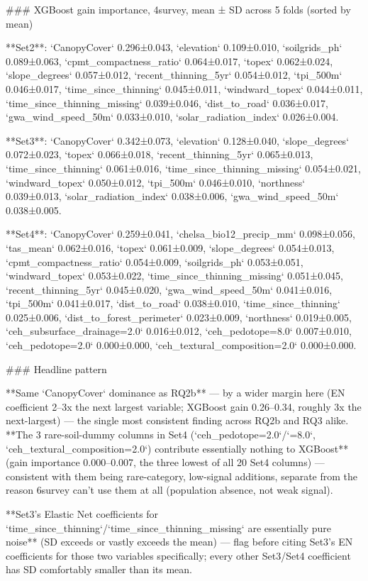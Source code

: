 ### XGBoost gain importance, 4survey, mean ± SD across 5 folds (sorted by mean)

**Set2**: `CanopyCover` 0.296±0.043, `elevation` 0.109±0.010, `soilgrids_ph` 0.089±0.063,
`cpmt_compactness_ratio` 0.064±0.017, `topex` 0.062±0.024, `slope_degrees` 0.057±0.012,
`recent_thinning_5yr` 0.054±0.012, `tpi_500m` 0.046±0.017, `time_since_thinning` 0.045±0.011,
`windward_topex` 0.044±0.011, `time_since_thinning_missing` 0.039±0.046, `dist_to_road`
0.036±0.017, `gwa_wind_speed_50m` 0.033±0.010, `solar_radiation_index` 0.026±0.004.

**Set3**: `CanopyCover` 0.342±0.073, `elevation` 0.128±0.040, `slope_degrees` 0.072±0.023,
`topex` 0.066±0.018, `recent_thinning_5yr` 0.065±0.013, `time_since_thinning` 0.061±0.016,
`time_since_thinning_missing` 0.054±0.021, `windward_topex` 0.050±0.012, `tpi_500m`
0.046±0.010, `northness` 0.039±0.013, `solar_radiation_index` 0.038±0.006, `gwa_wind_speed_50m`
0.038±0.005.

**Set4**: `CanopyCover` 0.259±0.041, `chelsa_bio12_precip_mm` 0.098±0.056, `tas_mean`
0.062±0.016, `topex` 0.061±0.009, `slope_degrees` 0.054±0.013, `cpmt_compactness_ratio`
0.054±0.009, `soilgrids_ph` 0.053±0.051, `windward_topex` 0.053±0.022,
`time_since_thinning_missing` 0.051±0.045, `recent_thinning_5yr` 0.045±0.020,
`gwa_wind_speed_50m` 0.041±0.016, `tpi_500m` 0.041±0.017, `dist_to_road` 0.038±0.010,
`time_since_thinning` 0.025±0.006, `dist_to_forest_perimeter` 0.023±0.009, `northness`
0.019±0.005, `ceh_subsurface_drainage=2.0` 0.016±0.012, `ceh_pedotope=8.0` 0.007±0.010,
`ceh_pedotope=2.0` 0.000±0.000, `ceh_textural_composition=2.0` 0.000±0.000.

### Headline pattern

**Same `CanopyCover` dominance as RQ2b** — by a wider margin here (EN coefficient 2–3x the next
largest variable; XGBoost gain 0.26–0.34, roughly 3x the next-largest) — the single most
consistent finding across RQ2b and RQ3 alike. **The 3 rare-soil-dummy columns in Set4
(`ceh_pedotope=2.0`/`=8.0`, `ceh_textural_composition=2.0`) contribute essentially nothing to
XGBoost** (gain importance 0.000–0.007, the three lowest of all 20 Set4 columns) — consistent
with them being rare-category, low-signal additions, separate from the reason 6survey can't use
them at all (population absence, not weak signal).

**Set3's Elastic Net coefficients for `time_since_thinning`/`time_since_thinning_missing` are
essentially pure noise** (SD exceeds or vastly exceeds the mean) — flag before citing Set3's EN
coefficients for those two variables specifically; every other Set3/Set4 coefficient has SD
comfortably smaller than its mean.

